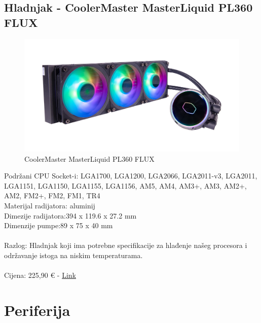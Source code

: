 \documentclass{report}
\begin{document}
\pagebreak

\section{Hladnjak - CoolerMaster MasterLiquid PL360 FLUX}
\begin{figure}[H]
    \centering
    \includegraphics[scale=0.22]{Slike/hladnjak.jpg}
    \caption{CoolerMaster MasterLiquid PL360 FLUX}
    \label{fig:hladnjak}
\end{figure}
Podržani CPU Socket-i: LGA1700, LGA1200, LGA2066, LGA2011-v3, LGA2011, LGA1151, LGA1150, LGA1155, LGA1156, AM5, AM4, AM3+, AM3, AM2+, AM2, FM2+, FM2, FM1, TR4\\Materijal radijatora: aluminij\\Dimezije radijatora:394 x 119.6 x 27.2 mm \\Dimenzije pumpe:89 x 75 x 40 mm\\\\Razlog: Hladnjak koji ima potrebne specifikacije za hlađenje našeg procesora i održavanje istoga na niskim temperaturama.\\\\Cijena: 225,90 € - \href{https://www.racunala.hr/cooler-master-pl360-flux-komplett-wasserkuhlung-schwarz-mly-d36m-a23pz-r1/228471/product/?utm\_source=nabava.net\&utm\_campaign=\\nabava.net\&utm\_medium=click}{Link}

\pagebreak

\chapter{Periferija}
\end{document}
